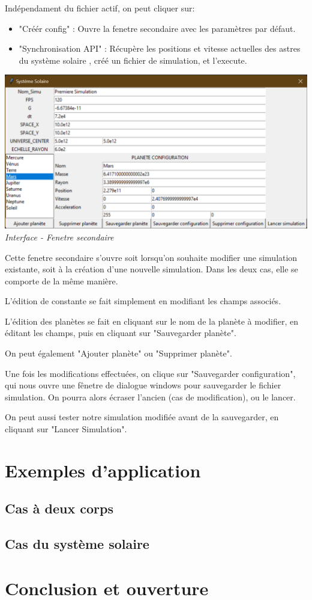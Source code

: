 \documentclass{article}
\begin{document}
    Indépendament du fichier actif, on peut cliquer sur:

    \begin{itemize}
        \item "Créér config" : Ouvre la fenetre secondaire avec les paramètres par défaut.
        \item "Synchronisation API" : Récupère les positions et vitesse actuelles des astres du système solaire , créé un fichier de simulation, et l'execute.
    \end{itemize}

    \begin{center}
        \includegraphics[scale=0.5]{interfaceFenetreSecondaire.png}\\    
        \emph{Interface - Fenetre secondaire}
    \end{center}

    Cette fenetre secondaire s'ouvre soit lorsqu'on souhaite modifier une simulation existante, soit à la création d'une nouvelle simulation. Dans les deux cas, elle se comporte de la même manière. 

    L'édition de constante se fait simplement en modifiant les champs associés. 

    L'édition des planètes se fait en cliquant sur le nom de la planète à modifier, en éditant les champs, puis en cliquant sur "Sauvegarder planète". 

    On peut également "Ajouter planète" ou "Supprimer planète".

    Une fois les modifications effectuées, on clique sur "Sauvegarder configuration", qui nous ouvre une fênetre de dialogue windows pour sauvegarder le fichier simulation. On pourra alors écraser l'ancien (cas de modification), ou le lancer. 

    On peut aussi tester notre simulation modifiée avant de la sauvegarder, en cliquant sur "Lancer Simulation".

\section{Exemples d'application}
    \subsection{Cas à deux corps}

    \subsection{Cas du système solaire}

\section{Conclusion et ouverture}
\end{document}
